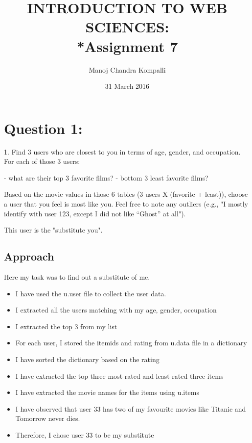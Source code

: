 \documentclass[12pt]{article}
\begin{document}
\begin{titlepage}
\title{INTRODUCTION TO WEB SCIENCES:\\*Assignment 7}
\author{Manoj Chandra Kompalli}
\date{31 March 2016}
\maketitle
\end{titlepage}

\tableofcontents
\newpage

\section{Question 1:  }
1.  Find 3 users who are closest to you in terms of age, 
gender, and occupation.  For each of those 3 users:

- what are their top 3 favorite films?
- bottom 3 least favorite films?

Based on the movie values in those 6 tables (3 users X (favorite +
least)), choose a user that you feel is most like you.  Feel 
free to note any outliers (e.g., "I mostly identify with user 123,
except I did not like ``Ghost'' at all").  

This user is the "substitute you".  

\subsection{Approach}
Here my task was to find out a substitute of me.
\begin{itemize} 
 \item I have used the u.user file to collect the user data.
 \item I extracted all the users matching with my age, gender, occupation
 \item I extracted the top 3 from my list
 \item For each user, I stored the itemids and rating from u.data file in a dictionary
 \item I have sorted the dictionary based on the rating
 \item	I have extracted the top three most rated and least rated three items
 \item	I have extracted the movie names for the items using u.items
 \item I have observed that user 33 has two of my favourite movies like Titanic and Tomorrow never dies.
 \item	Therefore, I chose user 33 to be my substitute

\end{itemize}
\end{document}
